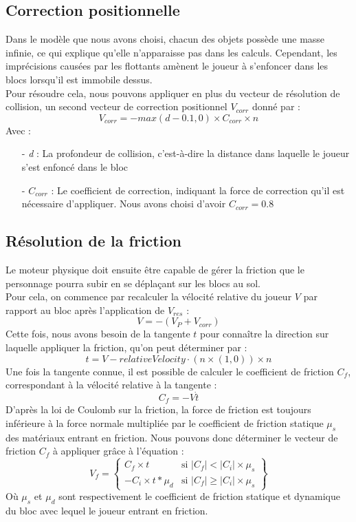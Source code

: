 \documentclass[10pt]{report}
\begin{document}
\subsection{Correction positionnelle}
Dans le modèle que nous avons choisi, chacun des objets possède une masse infinie, ce qui explique qu'elle n'apparaisse pas dans les calculs. Cependant, les imprécisions causées par les flottants amènent le joueur à s'enfoncer dans les blocs lorsqu'il est immobile dessus.\\
Pour résoudre cela, nous pouvons appliquer en plus du vecteur de résolution de collision, un second vecteur de correction positionnel \(V_{corr}\) donné par :
\[V_{corr} = -max(d-0.1,0) \times C_{corr} \times n\]
Avec :\\
\begin{itemize}
  \item[-] \emph{d} : La profondeur de collision, c'est-à-dire la distance dans laquelle le joueur s'est enfoncé dans le bloc
  \item[-] \(C_{corr}\) : Le coefficient de correction, indiquant la force de correction qu'il est nécessaire d'appliquer. Nous avons choisi d'avoir \(C_{corr}=0.8\)
\end{itemize}

\subsection{Résolution de la friction}
Le moteur physique doit ensuite être capable de gérer la friction que le personnage pourra subir en se déplaçant sur les blocs au sol.\\
Pour cela, on commence par recalculer la vélocité relative du joueur \(V\) par rapport au bloc après l'application de \(V_{res}\) :
\[V =  - (V_{P} + V_{corr})\]
Cette fois, nous avons besoin de la tangente \(t\) pour connaître la direction sur laquelle appliquer la friction, qu'on peut déterminer par :
\[t = V - relativeVelocity \cdot (n \times (1,0)) \times n\]
Une fois la tangente connue, il est possible de calculer le coefficient de friction \(C_{f}\), correspondant à la vélocité relative à la tangente :
\[C_{f} = - V \dot t\]
D'après la loi de Coulomb sur la friction, la force de friction est toujours inférieure à la force normale multipliée par le coefficient de friction statique \(\mu_{s}\) des matériaux entrant en friction. Nous pouvons donc déterminer le vecteur de friction \(C_{f}\) à appliquer grâce à l'équation :
\[
V_{f} = \left\{\begin{array}{lr}
           C_{f} \times t & \text{si } |C_{f}| < |C_{i}| \times \mu_{s}\\
          -C_{i} \times t * \mu_{d} & \text{si } |C_{f}| \geq |C_{i}| \times \mu_{s}
        \end{array}\right\}
\]
Où \(\mu_{s}\) et \(\mu_{d}\) sont respectivement le coefficient de friction statique et dynamique du bloc avec lequel le joueur entrant en friction.
\end{document}
